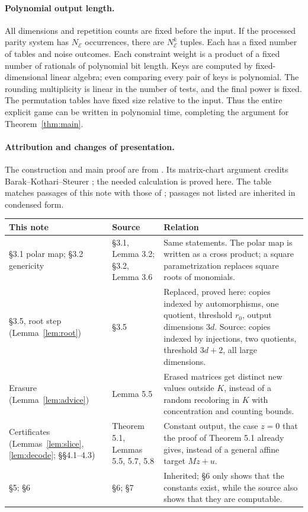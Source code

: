 \documentclass[11pt]{article}
\begin{document}
\paragraph{Polynomial output length.}
All dimensions and repetition counts are fixed before the input. If the
processed parity system has $N_{\mathcal E}$ occurrences, there are
$N_{\mathcal E}^k$ tuples. Each has a fixed number of tables and noise
outcomes. Each constraint weight is a product of a fixed number of
rationals of polynomial bit length. Keys are computed by fixed-dimensional
linear algebra; even comparing every pair of keys is polynomial.
The rounding multiplicity is linear in the number of tests, and the final
power is fixed. The permutation tables have fixed size relative to the
input. Thus the entire explicit game can be written in polynomial time,
completing the argument for Theorem~\ref{thm:main}.

\paragraph{Attribution and changes of presentation.}
The construction and main proof are from \cite{UGT}. Its matrix-chart
argument credits Barak--Kothari--Steurer \cite{BKS}; the needed
calculation is proved here. The table matches passages of this note with
those of \cite{UGT}; passages not listed are inherited in condensed form.

\begin{center}
\footnotesize
\begin{tabular}{@{}>{\raggedright\arraybackslash}p{}
 >{\raggedright\arraybackslash}p{}
 >{\raggedright\arraybackslash}p{}@{}}
\toprule
This note & Source & Relation\\
\midrule
\S3.1 polar map; \S3.2 genericity &
 \S3.1, Lemma 3.2; \S3.2, Lemma 3.6 &
 Same statements. The polar map is written as a cross product; a square
 parametrization replaces square roots of monomials.\\
\S3.5, root step (Lemma~\ref{lem:root}) & \S3.5 &
 Replaced, proved here: copies indexed by automorphisms, one quotient,
 threshold $r_0$, output dimensions $3d$. Source: copies indexed by
 injections, two quotients, threshold $3d+2$, all large dimensions.\\
Erasure (Lemma~\ref{lem:advice}) & Lemma 5.5 &
 Erased matrices get distinct new values outside $K$, instead of a random
 recoloring in $K$ with concentration and counting bounds.\\
Certificates (Lemmas~\ref{lem:slice}, \ref{lem:decode}; \S\S4.1--4.3) &
 Theorem 5.1, Lemmas 5.5, 5.7, 5.8 &
 Constant output, the case $z=0$ that the proof of Theorem 5.1 already
 gives, instead of a general affine target $Mz+u$.\\
\S5; \S6 & \S6; \S7 & Inherited; \S6 only shows that the constants exist,
 while the source also shows that they are computable.\\
\bottomrule
\end{tabular}
\end{center}
\end{document}

